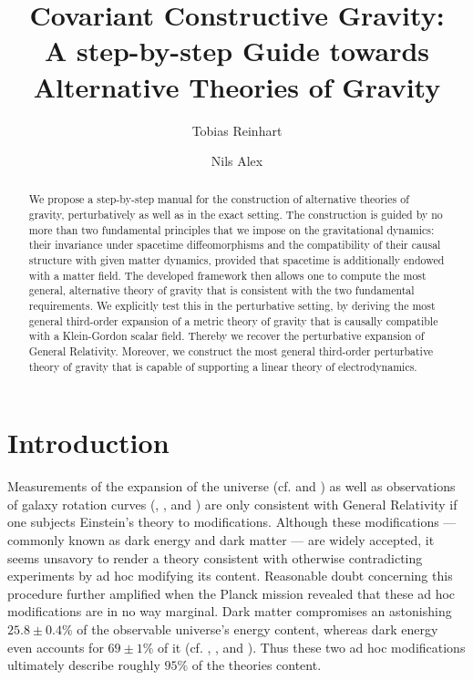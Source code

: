 \documentclass[%
 reprint,
nofootinbib,
 amsmath,amssymb,
 aps,
 prd,
floatfix,
]{revtex4-2}
\begin{document}

\title{Covariant Constructive Gravity:\\
A step-by-step Guide towards Alternative Theories of Gravity}

\author{Tobias Reinhart}
\author{Nils Alex}


\begin{abstract}
We propose a step-by-step manual for the construction of alternative theories of gravity, perturbatively as well as in the exact setting. The construction is guided by no more than two fundamental principles that we impose on the gravitational dynamics: their invariance under spacetime diffeomorphisms and the compatibility of their causal structure with given matter dynamics, provided that spacetime is additionally endowed with a matter field. The developed framework then allows one to compute the most general, alternative theory of gravity that is consistent with the two fundamental requirements. We explicitly test this in the perturbative setting, by deriving the most general third-order expansion of a metric theory of gravity that is causally compatible with a Klein-Gordon scalar field. Thereby we recover the perturbative expansion of General Relativity. Moreover, we construct the most general third-order perturbative theory of gravity that is capable of supporting a linear theory of electrodynamics.
\end{abstract}

\maketitle

\section{Introduction}
Measurements of the expansion of the universe (cf. \cite{1999ApJ...517..565P} and \cite{1998AJ....116.1009R}) as well as observations of galaxy rotation curves (\cite{1970ApJ...160..811F}, \cite{1970ApJ...159..379R}, and \cite{1980ApJ...238..471R}) are only consistent with General Relativity if one subjects Einstein's theory to modifications. Although these modifications --- commonly known as dark energy and dark matter --- are widely accepted, it seems unsavory to render a theory consistent with otherwise contradicting experiments by ad hoc modifying its content. Reasonable doubt concerning this procedure further amplified when the Planck mission revealed that these ad hoc modifications are in no way marginal. Dark matter compromises an astonishing $ 25.8\pm0.4\%$ of the observable universe's energy content, whereas dark energy even accounts for $ 69 \pm 1 \%$ of it (cf. \cite{Planck13_1}, \cite{Planck13_2}, \cite{Planck15} and \cite{Planck18}). Thus these two ad hoc modifications ultimately describe roughly $95\%$ of the theories content. 
\end{document}

